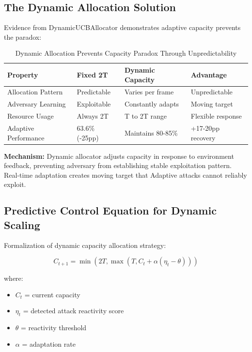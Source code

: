 \documentclass[11pt,a4paper]{article}
\begin{document}
\subsection{The Dynamic Allocation Solution}

Evidence from DynamicUCBAllocator demonstrates adaptive capacity prevents the paradox:

\vspace{-0.4cm}

\begin{table}[h]
\scriptsize
\centering
\begin{tabular}{llll}
\toprule
\textbf{Property} & \textbf{Fixed 2T} & \textbf{Dynamic Capacity} & \textbf{Advantage} \\
\midrule
Allocation Pattern & Predictable & Varies per frame & Unpredictable \\
Adversary Learning & Exploitable & Constantly adapts & Moving target \\
Resource Usage & Always 2T & T to 2T range & Flexible response \\
Adaptive Performance & 63.6\% (-25pp) & Maintains 80-85\% & +17-20pp recovery \\
\bottomrule
\end{tabular}
\vspace{-0.2cm}
\caption{Dynamic Allocation Prevents Capacity Paradox Through Unpredictability}
\end{table}

\vspace{-0.2cm}

\textbf{Mechanism:} Dynamic allocator adjusts capacity in response to environment feedback, preventing adversary from establishing stable exploitation pattern. Real-time adaptation creates moving target that Adaptive attacks cannot reliably exploit.

\subsection{Predictive Control Equation for Dynamic Scaling}

Formalization of dynamic capacity allocation strategy:

\vspace{-0.4cm}

\begin{equation}
C_{t+1} = \min(2T, \max(T, C_t + \alpha(\eta_t - \theta)))
\end{equation}

where:
\begin{itemize}
\item $C_t$ = current capacity
\item $\eta_t$ = detected attack reactivity score
\item $\theta$ = reactivity threshold
\item $\alpha$ = adaptation rate
\end{itemize}
\end{document}
